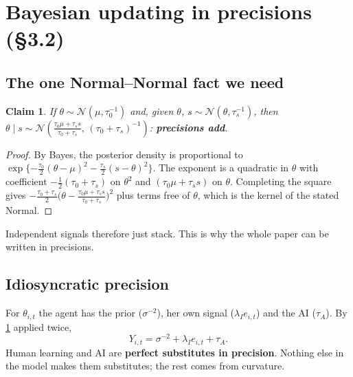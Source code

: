 \documentclass[11pt,a4paper]{article}
\newtheorem{claim}{Claim}[section]
\theoremstyle{definition}
\theoremstyle{remark}
\newcommand{\N}{\mathcal{N}}
\newcommand{\tA}{\tau_A}
\newcommand{\lI}{\lambda_I}
\begin{document}
\section{Bayesian updating in precisions (\S3.2)}

\subsection{The one Normal--Normal fact we need}
\begin{claim}\label{cl:nn}
If $\theta\sim\N(\mu,\tau_0^{-1})$ and, given $\theta$, $s\sim\N(\theta,\tau_s^{-1})$, then
$\theta\mid s\sim\N\!\left(\frac{\tau_0\mu+\tau_s s}{\tau_0+\tau_s},\,(\tau_0+\tau_s)^{-1}\right)$:
\textbf{precisions add}.
\end{claim}
\begin{proof}
By Bayes, the posterior density is proportional to
$\exp\{-\tfrac{\tau_0}{2}(\theta-\mu)^2-\tfrac{\tau_s}{2}(s-\theta)^2\}$. The exponent is a quadratic in
$\theta$ with coefficient $-\tfrac12(\tau_0+\tau_s)$ on $\theta^2$ and $(\tau_0\mu+\tau_s s)$ on $\theta$.
Completing the square gives $-\frac{\tau_0+\tau_s}{2}\bigl(\theta-\frac{\tau_0\mu+\tau_s s}{\tau_0+\tau_s}\bigr)^2$
plus terms free of $\theta$, which is the kernel of the stated Normal.
\end{proof}
Independent signals therefore just stack. This is why the whole paper can be written in precisions.

\subsection{Idiosyncratic precision}
For $\theta_{i,t}$ the agent has the prior ($\sigma^{-2}$), her own signal ($\lI e_{i,t}$) and the AI
($\tA$). By \cref{cl:nn} applied twice,
\begin{equation}\label{eq:Y}
Y_{i,t}=\sigma^{-2}+\lI e_{i,t}+\tA. \tag{4}
\end{equation}
Human learning and AI are \textbf{perfect substitutes in precision}. Nothing else in the model makes them
substitutes; the rest comes from curvature.
\end{document}
